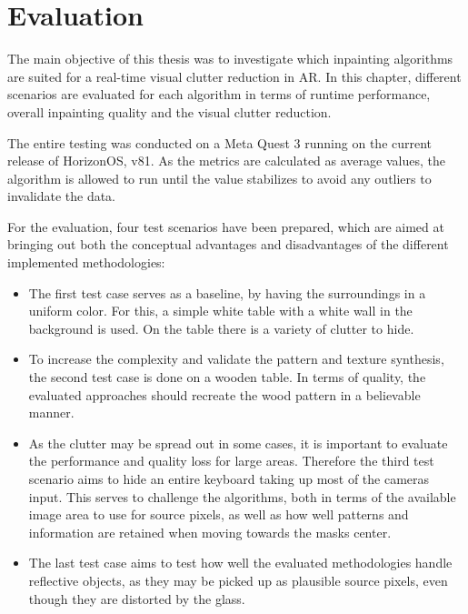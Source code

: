 \chapter{Evaluation}
\label{cha:Evaluation}

The main objective of this thesis was to investigate which inpainting algorithms are suited for a real-time visual clutter reduction in AR. In this chapter, different scenarios are evaluated for each algorithm in terms of runtime performance, overall inpainting quality and the visual clutter reduction.

The entire testing was conducted on a Meta Quest 3 running on the current release of HorizonOS, v81. As the metrics are calculated as average values, the algorithm is allowed to run until the value stabilizes to avoid any outliers to invalidate the data.

For the evaluation, four test scenarios have been prepared, which are aimed at bringing out both the conceptual advantages and disadvantages of the different implemented methodologies:

\begin{itemize}
    \item The first test case serves as a baseline, by having the surroundings in a uniform color. For this, a simple white table with a white wall in the background is used. On the table there is a variety of clutter to hide.

    \item To increase the complexity and validate the pattern and texture synthesis, the second test case is done on a wooden table. In terms of quality, the evaluated approaches should recreate the wood pattern in a believable manner.

    \item As the clutter may be spread out in some cases, it is important to evaluate the performance and quality loss for large areas. Therefore the third test scenario aims to hide an entire keyboard taking up most of the cameras input. This serves to challenge the algorithms, both in terms of the available image area to use for source pixels, as well as how well patterns and information are retained when moving towards the masks center.
    
    \item The last test case aims to test how well the evaluated methodologies handle reflective objects, as they may be picked up as plausible source pixels, even though they are distorted by the glass.
\end{itemize}

